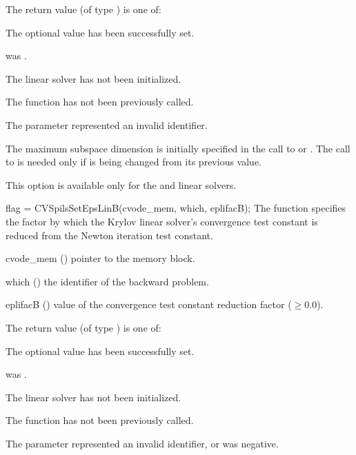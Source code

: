 {
  The return value  (of type ) is one of:
  \begin{args}
  \item[\Id{CVSPILS\_SUCCESS}] 
    The optional value has been successfully set.
  \item[\Id{CVSPILS\_MEM\_NULL}]
     was .
  \item[\Id{CVSPILS\_LMEM\_NULL}]
    The {\cvspils} linear solver has not been initialized.
  \item[\Id{CVSPILS\_NO\_ADJ}]
    The function  has not been previously called.
  \item[\Id{CVSPILS\_ILL\_INPUT}]
    The parameter  represented an invalid identifier.
  \end{args}
}
{
  The maximum subspace dimension is initially specified in the call
  to  or .
  The call to  is needed only if  is being changed
  from its previous value.

  {\warn}This option is available only for the {\cvspbcg} and {\cvsptfqmr} linear solvers.

}
{
  flag = CVSpilsSetEpsLinB(cvode\_mem, which, eplifacB);
}
{
  The function  specifies the factor by
  which the Krylov linear solver's convergence test constant is reduced
  from the Newton iteration test constant.
}
{
  \begin{args}
  \item[cvode\_mem] ()
    pointer to the {\cvodes} memory block.
  \item[which] ()
    the identifier of the backward problem.
  \item[eplifacB] ()
    value of the convergence test constant reduction factor ($\geq 0.0$).
  \end{args}
}
{
  The return value  (of type ) is one of:
  \begin{args}
  \item[\Id{CVSPILS\_SUCCESS}] 
    The optional value has been successfully set.
  \item[\Id{CVSPILS\_MEM\_NULL}]
     was .
  \item[\Id{CVSPILS\_LMEM\_NULL}]
    The {\cvspils} linear solver has not been initialized.
  \item[\Id{CVSPILS\_NO\_ADJ}]
    The function  has not been previously called.
  \item[\Id{CVSPILS\_ILL\_INPUT}]
    The parameter  represented an invalid identifier, or
     was negative.
  \end{args}
}
